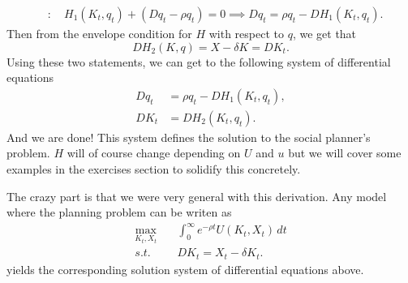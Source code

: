 \documentclass[11pt,english]{article}
\begin{document}
\begin{align*}
[K_t]&:\quad H_1(K_t, q_t) + (Dq_t - \rho q_t) = 0 \implies Dq_t = \rho q_t - DH_1(K_t, q_t).
\end{align*} Then from the envelope condition for $H$ with respect to $q$, we get that $$DH_2(K, q) = X - \delta K = DK_t.$$Using these two statements, we can get to the following system of differential equations 
\begin{align*}
Dq_t &= \rho q_t - DH_1(K_t, q_t),\\
DK_t &= DH_2(K_t, q_t).
\end{align*} And we are done! This system defines the solution to the social planner's problem. $H$ will of course change depending on $U$ and $u$ but we will cover some examples in the exercises section to solidify this concretely.

The crazy part is that we were very general with this derivation. Any model where the planning problem can be writen as \begin{align*}
\max_{K_t, X_t}&\quad \int_0^\infty e^{-\rho t}U(K_t, X_t)\,dt\\
s.t.&\quad DK_t = X_t - \delta K_t.
\end{align*} yields the corresponding solution system of differential equations above.
\end{document}
